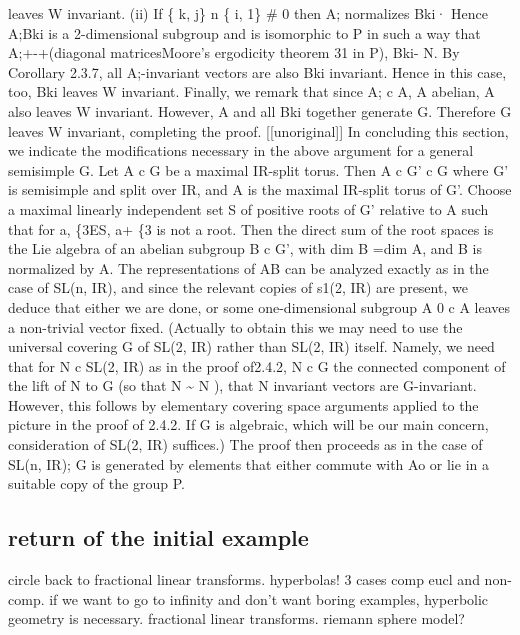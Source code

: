 \documentclass[
]{article}
\begin{document}
leaves W invariant. (ii) If \{ k, j\} n \{ i, 1\} \# 0 then A;
normalizes Bki· Hence A;Bki is a 2-dimensional subgroup and is
isomorphic to P in such a way that A;+-+(diagonal matricesMoore's
ergodicity theorem 31 in P), Bki- N. By Corollary 2.3.7, all
A;-invariant vectors are also Bki invariant. Hence in this case, too,
Bki leaves W invariant. Finally, we remark that since A; c A, A abelian,
A also leaves W invariant. However, A and all Bki together generate G.
Therefore G leaves W invariant, completing the proof.
{[}{[}unoriginal{]}{]} In concluding this section, we indicate the
modifications necessary in the above argument for a general semisimple
G. Let A c G be a maximal IR-split torus. Then A c G' c G where G' is
semisimple and split over IR, and A is the maximal IR-split torus of G'.
Choose a maximal linearly independent set S of positive roots of G'
relative to A such that for a, \{3ES, a+ \{3 is not a root. Then the
direct sum of the root spaces is the Lie algebra of an abelian subgroup
B c G', with dim B =dim A, and B is normalized by A. The representations
of AB can be analyzed exactly as in the case of SL(n, IR), and since the
relevant copies of s1(2, IR) are present, we deduce that either we are
done, or some one-dimensional subgroup A 0 c A leaves a non-trivial
vector fixed. (Actually to obtain this we may need to use the universal
covering G of SL(2, IR) rather than SL(2, IR) itself. Namely, we need
that for N c SL(2, IR) as in the proof of2.4.2, N c G the connected
component of the lift of N to G (so that N \textasciitilde{} N ), that N
invariant vectors are G-invariant. However, this follows by elementary
covering space arguments applied to the picture in the proof of 2.4.2.
If G is algebraic, which will be our main concern, consideration of
SL(2, IR) suffices.) The proof then proceeds as in the case of SL(n,
IR); G is generated by elements that either commute with Ao or lie in a
suitable copy of the group P.

\hypertarget{return-of-the-initial-example}{%
\subsection{return of the initial
example}\label{return-of-the-initial-example}}

circle back to fractional linear transforms.
hyperbolas! 3 cases comp eucl and non-comp. if we want to go to infinity
and don't want boring examples, hyperbolic geometry is necessary.
fractional linear transforms. riemann sphere model?

\printbibliography
\end{document}
